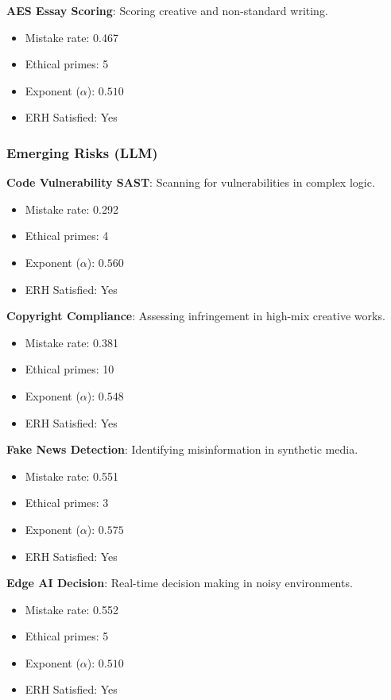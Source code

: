 \documentclass[12pt,a4paper]{article}
\theoremstyle{definition}
\theoremstyle{remark}
\begin{document}
\textbf{AES Essay Scoring}: Scoring creative and non-standard writing.
\begin{itemize}
    \item Mistake rate: 0.467
    \item Ethical primes: 5
    \item Exponent ($\alpha$): $0.510$
    \item ERH Satisfied: Yes
\end{itemize}

\subsubsection{Emerging Risks (LLM)}

\textbf{Code Vulnerability SAST}: Scanning for vulnerabilities in complex logic.
\begin{itemize}
    \item Mistake rate: 0.292
    \item Ethical primes: 4
    \item Exponent ($\alpha$): $0.560$
    \item ERH Satisfied: Yes
\end{itemize}

\textbf{Copyright Compliance}: Assessing infringement in high-mix creative works.
\begin{itemize}
    \item Mistake rate: 0.381
    \item Ethical primes: 10
    \item Exponent ($\alpha$): $0.548$
    \item ERH Satisfied: Yes
\end{itemize}

\textbf{Fake News Detection}: Identifying misinformation in synthetic media.
\begin{itemize}
    \item Mistake rate: 0.551
    \item Ethical primes: 3
    \item Exponent ($\alpha$): $0.575$
    \item ERH Satisfied: Yes
\end{itemize}

\textbf{Edge AI Decision}: Real-time decision making in noisy environments.
\begin{itemize}
    \item Mistake rate: 0.552
    \item Ethical primes: 5
    \item Exponent ($\alpha$): $0.510$
    \item ERH Satisfied: Yes
\end{itemize}
\end{document}
